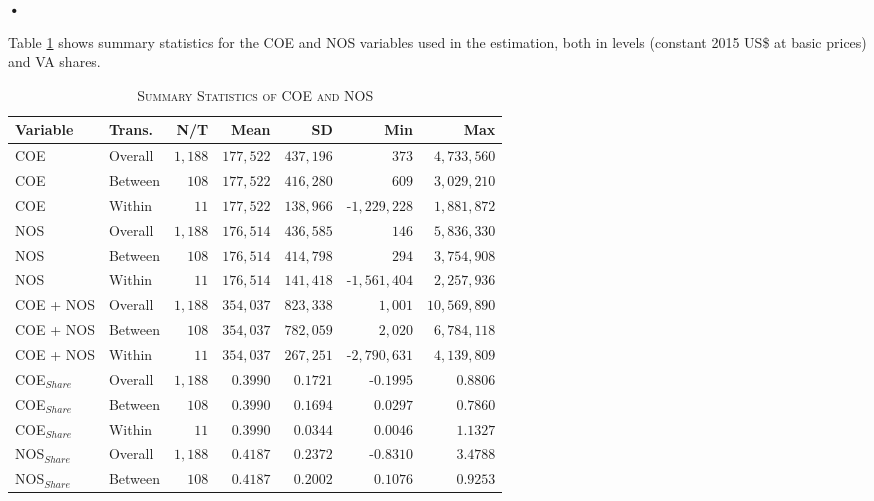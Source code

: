 \textbf{\textbf{•}}\documentclass[a4paper]{article}
\begin{document}
Table \ref{tab:SUMM_VADEC} shows summary statistics for the COE and NOS variables used in the estimation, both in levels (constant 2015 US\$ at basic prices)  and VA shares. 



\begin{table}[h!] \centering 
  \caption{\label{tab:SUMM_VADEC}\textsc{Summary Statistics of COE and NOS}}
  \vspace{2mm}
\begin{tabular}{llrrrrr} \toprule
Variable & Trans. & N/T & Mean & SD & Min & Max \\ \midrule
COE & Overall & $1,188$ & $177,522$ & $437,196$ & $373$ & $4,733,560$ \\ 
COE & Between & $108$ & $177,522$ & $416,280$ & $609$ & $3,029,210$ \\ 
COE & Within & $11$ & $177,522$ & $138,966$ & -$1,229,228$ & $1,881,872$ \\ 
NOS & Overall & $1,188$ & $176,514$ & $436,585$ & $146$ & $5,836,330$ \\ 
NOS & Between & $108$ & $176,514$ & $414,798$ & $294$ & $3,754,908$ \\ 
NOS & Within & $11$ & $176,514$ & $141,418$ & -$1,561,404$ & $2,257,936$ \\ 
COE + NOS & Overall & $1,188$ & $354,037$ & $823,338$ & $1,001$ & $10,569,890$ \\ 
COE + NOS & Between & $108$ & $354,037$ & $782,059$ & $2,020$ & $6,784,118$ \\ 
COE + NOS & Within & $11$ & $354,037$ & $267,251$ & -$2,790,631$ & $4,139,809$ \\ 
COE$_{Share}$ & Overall & $1,188$ & $0.3990$ & $0.1721$ & -$0.1995$ & $0.8806$ \\ 
COE$_{Share}$ & Between & $108$ & $0.3990$ & $0.1694$ & $0.0297$ & $0.7860$ \\ 
COE$_{Share}$ & Within & $11$ & $0.3990$ & $0.0344$ & $0.0046$ & $1.1327$ \\ 
NOS$_{Share}$ & Overall & $1,188$ & $0.4187$ & $0.2372$ & -$0.8310$ & $3.4788$ \\ 
NOS$_{Share}$ & Between & $108$ & $0.4187$ & $0.2002$ & $0.1076$ & $0.9253$ \\ 

\end{tabular}
\end{table}
\end{document}
